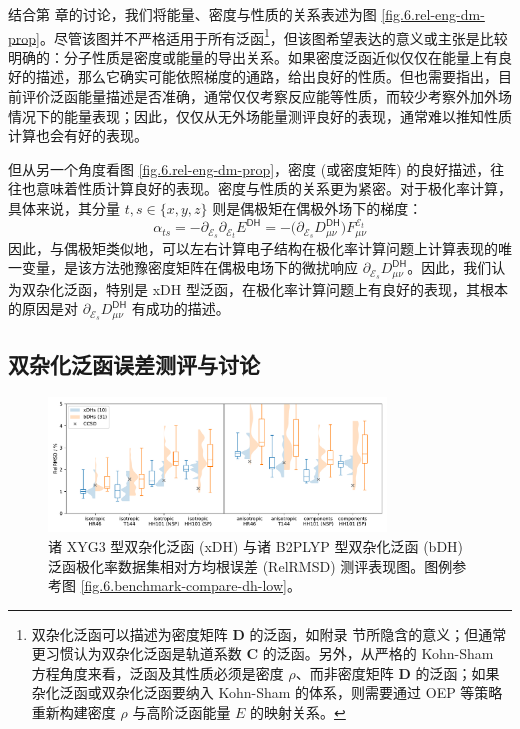 结合第  章的讨论，我们将能量、密度与性质的关系表述为图 \ref{fig.6.rel-eng-dm-prop}。尽管该图并不严格适用于所有泛函\footnote{双杂化泛函可以描述为密度矩阵 $\mathbf{D}$ 的泛函，如附录  节所隐含的意义；但通常更习惯认为双杂化泛函是轨道系数 $\mathbf{C}$ 的泛函。另外，从严格的 Kohn-Sham 方程角度来看，泛函及其性质必须是密度 $\rho$、而非密度矩阵 $\mathbf{D}$ 的泛函；如果杂化泛函或双杂化泛函要纳入 Kohn-Sham 的体系，则需要通过 OEP 等策略重新构建密度 $\rho$ 与高阶泛函能量 $E$ 的映射关系。}，但该图希望表达的意义或主张是比较明确的：分子性质是密度或能量的导出关系。如果密度泛函近似仅仅在能量上有良好的描述，那么它确实可能依照梯度的通路，给出良好的性质。但也需要指出，目前评价泛函能量描述是否准确，通常仅仅考察反应能等性质，而较少考察外加外场情况下的能量表现；因此，仅仅从无外场能量测评良好的表现，通常难以推知性质计算也会有好的表现。

但从另一个角度看图 \ref{fig.6.rel-eng-dm-prop}，密度 (或密度矩阵) 的良好描述，往往也意味着性质计算良好的表现。密度与性质的关系更为紧密。对于极化率计算，具体来说，其分量 $t, s \in \{ x, y, z \}$ 则是偶极矩在偶极外场下的梯度：
\begin{equation}
    \alpha_{ts} = - \partial_{\mathcal{E}_s} \partial_{\mathcal{E}_t} E^\textsf{DH} = - \big( \partial_{\mathcal{E}_s} D_{\mu \nu}^\textsf{DH} \big) F_{\mu \nu}^{\mathcal{E}_t}
\end{equation}
因此，与偶极矩类似地，可以左右计算电子结构在极化率计算问题上计算表现的唯一变量，是该方法弛豫密度矩阵在偶极电场下的微扰响应 $\partial_{\mathcal{E}_s} D_{\mu \nu}^\textsf{DH}$。因此，我们认为双杂化泛函，特别是 xDH 型泛函，在极化率计算问题上有良好的表现，其根本的原因是对 $\partial_{\mathcal{E}_s} D_{\mu \nu}^\textsf{DH}$ 有成功的描述。

\subsection{双杂化泛函误差测评与讨论}

\begin{figure}[!t]
    \centering
    \includegraphics[width=0.8\textwidth]{assets/benchmark-compare-xdh-bdh.pdf}
    \caption[xDH 与 bDH 极化率 RelRMSD 测评表现与对比图]{诸 XYG3 型双杂化泛函 (xDH) 与诸 B2PLYP 型双杂化泛函 (bDH) 泛函极化率数据集相对方均根误差 (RelRMSD) 测评表现图。图例参考图 \ref{fig.6.benchmark-compare-dh-low}。}
    \label{fig.6.benchmark-compare-xdh-bdh}
\end{figure}

